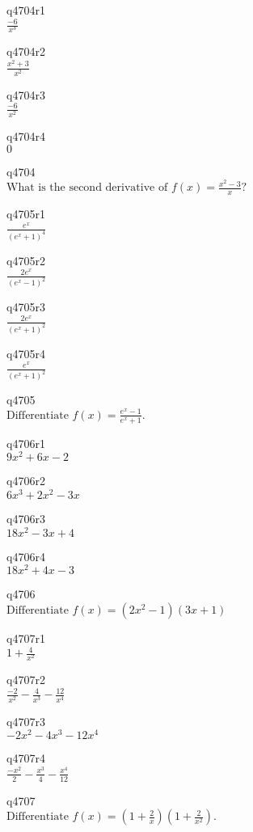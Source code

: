 q4704r1\\
\(\displaystyle \frac{-6}{x^3} \)

q4704r2\\
\(\displaystyle \frac{x^2 + 3}{x^2} \)

q4704r3\\
\(\displaystyle \frac{-6}{x^2} \)

q4704r4\\
\(\displaystyle 0 \)

q4704\\
\(\displaystyle \text{What is the second derivative of } f(x) = \frac{x^2 - 3}{x}? \)

q4705r1\\
\(\displaystyle \frac{e^x}{(e^x + 1)^4} \)

q4705r2\\
\(\displaystyle \frac{2e^x}{(e^x - 1)^2} \)

q4705r3\\
\(\displaystyle \frac{2e^x}{(e^x + 1)^2} \)

q4705r4\\
\(\displaystyle \frac{e^x}{(e^x + 1)^2} \)

q4705\\
\(\displaystyle \text{Differentiate } f(x) = \frac{e^x - 1}{e^x + 1}. \)

q4706r1\\
\(\displaystyle 9x^2 + 6x - 2 \)

q4706r2\\
\(\displaystyle 6x^3 + 2x^2 - 3x \)

q4706r3\\
\(\displaystyle 18x^2 - 3x + 4 \)

q4706r4\\
\(\displaystyle 18x^2 + 4x - 3 \)

q4706\\
\(\displaystyle \text{Differentiate } f(x) = (2x^2-1)(3x+1) \)

q4707r1\\
\(\displaystyle 1 + \frac{4}{x^2} \)

q4707r2\\
\(\displaystyle \frac{-2}{x^2} - \frac{4}{x^3} - \frac{12}{x^4} \)

q4707r3\\
\(\displaystyle -2x^2 - 4x^3 - 12x^4 \)

q4707r4\\
\(\displaystyle \frac{-x^2}{2} - \frac{x^3}{4} - \frac{x^4}{12} \)

q4707\\
\(\displaystyle \text{Differentiate } f(x) = \left ( 1 + \frac{2}{x} \right ) \left ( 1 + \frac{2}{x^2} \right ). \)


